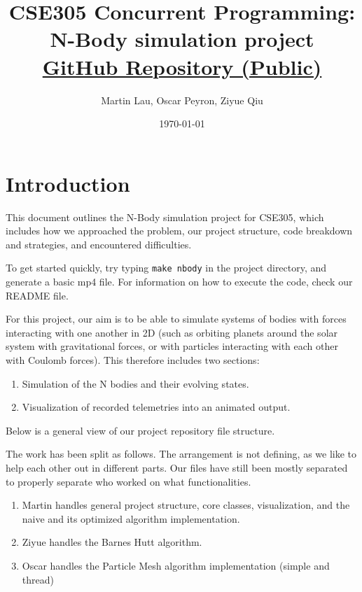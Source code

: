 \documentclass{article}
\title{CSE305 Concurrent Programming: N-Body simulation project\\[0.5em]
\href{https://github.com/thatmartinlau/ConcurrentProject}{\small{GitHub Repository (Public)}}}
\author{Martin Lau, Oscar Peyron, Ziyue Qiu}
\date{\today}
\begin{document}
\maketitle

\section{Introduction}
This document outlines the N-Body simulation project for CSE305, which includes how we approached the problem, our project structure, code breakdown and strategies, and encountered difficulties.

To get started quickly, try typing \texttt{make nbody} in the project directory, and generate a basic mp4 file.
For information on how to execute the code, check our README file.

For this project, our aim is to be able to simulate systems of bodies with forces interacting with one another in 2D (such as orbiting planets around the solar system with gravitational forces, or with particles interacting with each other with Coulomb forces). This therefore includes two sections:
\begin{enumerate}
    \item Simulation of the N bodies and their evolving states.
    \item Visualization of recorded telemetries into an animated output.
\end{enumerate}

Below is a general view of our project repository file structure. 

\begin{tcolorbox}[title=Project directory summary]
\end{tcolorbox}

The work has been split as follows. The arrangement is not defining, as we like to help each other out in different parts. Our files have still been mostly separated to properly separate who worked on what functionalities.
\begin{enumerate}
    \item Martin handles general project structure, core classes, visualization, and the naive and its optimized algorithm implementation.
    \item Ziyue handles the Barnes Hutt algorithm.
    \item Oscar handles the Particle Mesh algorithm implementation (simple and thread) 
\end{enumerate}
\end{document}
